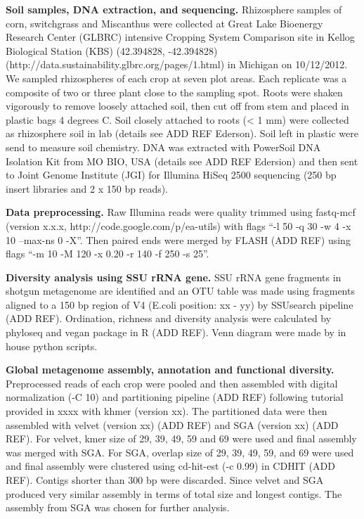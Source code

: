 \documentclass[12pt]{article}
\begin{document}
{\bf Soil samples, DNA extraction, and sequencing.}
Rhizosphere samples of corn, switchgrass and Miscanthus were collected at Great Lake Bioenergy Research Center (GLBRC) intensive Cropping System Comparison site in Kellog Biological Station (KBS) (42.394828, -42.394828) (http://data.sustainability.glbrc.org/pages/1.html) in Michigan on 10/12/2012. We sampled rhizospheres of each crop at seven plot areas. Each replicate was a composite of two or three plant close to the sampling spot. Roots were shaken vigorously to remove loosely attached soil, then cut off from stem and placed in plastic bags 4 degrees C. Soil closely attached to roots ({\textless} 1 mm) were collected as rhizosphere soil in lab (details see ADD REF Ederson). Soil left in plastic were send to measure soil chemistry. DNA was extracted with PowerSoil DNA Isolation Kit from MO BIO, USA (details see ADD REF Edersion) and then sent to Joint Genome Institute (JGI) for Illumina HiSeq 2500 sequencing (250 bp insert libraries and 2 x 150 bp reads).

{\bf Data preprocessing.}
Raw Illumina reads were quality trimmed using fastq-mcf (version x.x.x, http://code.google.com/p/ea-utils) with flags ``-l 50 -q 30 -w 4 -x 10 --max-ns 0 -X''. Then paired ends were merged by FLASH (ADD REF) using flags ``-m 10 -M 120 -x 0.20 -r 140 -f 250 -s 25''.

{\bf Diversity analysis using SSU rRNA gene.}
SSU rRNA gene fragments in shotgun metagenome are identified and an OTU table was made using fragments aligned to a 150 bp region of V4 (E.coli position: xx - yy) by SSUsearch pipeline (ADD REF). Ordination, richness and diversity analysis were calculated by phyloseq and vegan package in R (ADD REF). Venn diagram were made by in house python scripts.

{\bf Global metagenome assembly, annotation and functional diversity.}
Preprocessed reads of each crop were pooled and then assembled with digital normalization (-C 10) and partitioning pipeline (ADD REF) following tutorial provided in xxxx with khmer (version xx). The partitioned data were then assembled with velvet (version xx) (ADD REF) and SGA (version xx) (ADD REF). For velvet, kmer size of 29, 39, 49, 59 and 69 were used and final assembly was merged with SGA. For SGA, overlap size of 29, 39, 49, 59, and 69 were used and final assembly were clustered using cd-hit-est (-c 0.99) in CDHIT (ADD REF). Contigs shorter than 300 bp were discarded. Since velvet and SGA produced very similar assembly in terms of total size and longest contigs. The assembly from SGA was chosen for further analysis.
\end{document}
